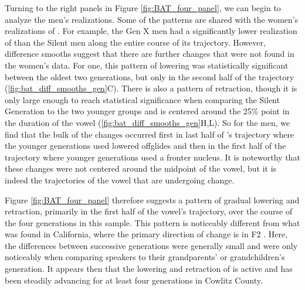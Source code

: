 Turning to the right panels in Figure \ref{fig:BAT_four_panel}, we can begin to analyze the men's realizations. Some of the patterns are shared with the women's realizations of \bat. For example, the Gen X men had a significantly lower realization of \bat than the Silent men along the entire course of its trajectory. However, difference smooths suggest that there are further changes that were not found in the women's data. For one, this pattern of lowering \bat was statistically significant between the oldest two generations, but only in the second half of the trajectory (\ref{fig:bat_diff_smooths_gen}C). There is also a pattern of retraction, though it is only large enough to reach statistical significance when comparing the Silent Generation to the two younger groups and is centered around the 25\% point in the duration of the vowel (\ref{fig:bat_diff_smooths_gen}H,L). So for the men, we find that the bulk of the changes occurred first in last half of \bat's trajectory where the younger generations used lowered offglides and then in the first half of the trajectory where younger generations used a fronter nucleus. It is noteworthy that these changes were not centered around the midpoint of the vowel, but it is indeed the trajectories of the vowel that are undergoing change.

Figure \ref{fig:BAT_four_panel} therefore suggests a pattern of gradual lowering and retraction, primarily in the first half of the vowel's trajectory, over the course of the four generations in this sample. This pattern is noticeably different from what was found in California, where the primary direction of change is in F2 \citep{donofrio_etal_2019}. Here, the differences between successive generations were generally small and were only noticeably when comparing speakers to their grandparents' or grandchildren's generation. It appears then that the lowering and retraction of \bat is active and has been steadily advancing for at least four generations in Cowlitz County.

